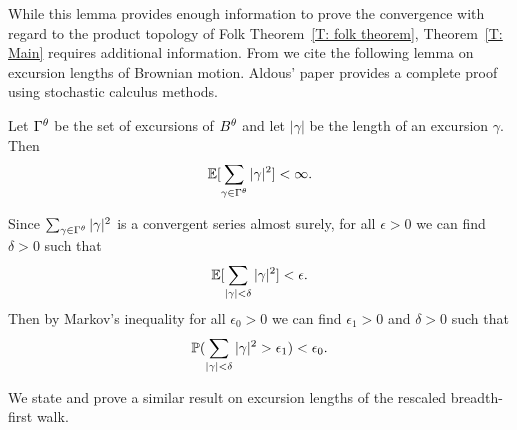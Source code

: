 While this lemma provides enough information to prove the convergence with regard to the product topology of Folk Theorem~\ref{T: folk theorem},
Theorem~\ref{T: Main} requires additional information.
From \cite[Lemma 25, p.843]{Aldous.1997} we cite the following lemma on excursion lengths of Brownian motion.
Aldous' paper provides a complete proof using stochastic calculus methods.
\begin{lemma} \label{L: BM in ld}
	Let $\Gamma^{\theta}$ be the set of excursions of $B^{\theta}$ and let $|\gamma|$ be the length of an excursion $\gamma$.
	Then
	\begin{equation}
		\mathbb{E}[\sum_{\gamma \in \Gamma^{\theta}} |\gamma|^2] < \infty.
	\end{equation}
\end{lemma}

Since $\sum_{\gamma \in \Gamma^{\theta}} |\gamma|^2$ is a convergent series almost surely,
for all $\epsilon > 0$ we can find $\delta > 0$ such that
\begin{equation}
	\mathbb{E}[\sum_{|\gamma| < \delta} |\gamma|^2] < \epsilon.
\end{equation}
Then by Markov's inequality for all $\epsilon_0 > 0$ we can find $\epsilon_1 > 0$ and $\delta > 0$ such that
\begin{equation} \label{E: sum gamma < delta}
	\mathbb{P}(\sum_{|\gamma| < \delta} |\gamma|^2 > \epsilon_1) < \epsilon_0.
\end{equation}

We state and prove a similar result on excursion lengths of the rescaled breadth-first walk.

